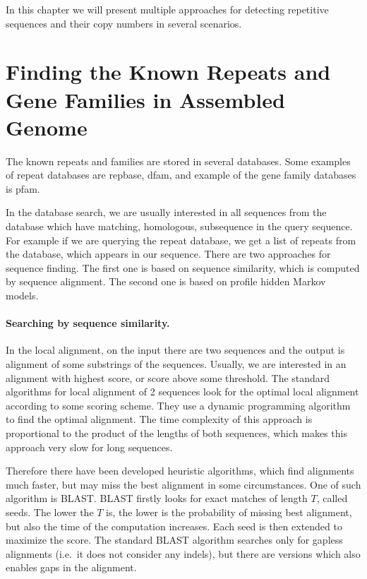 In this chapter we will present multiple approaches for detecting repetitive sequences and their copy numbers in several scenarios.


\section{Finding the Known Repeats and Gene Families in Assembled Genome}

The known repeats and families are stored in several databases. Some examples of repeat databases are repbase\cite{repbase}, dfam\cite{dfam}, and example of the gene family databases is pfam\cite{pfam}.

In the database search, we are usually interested in all  sequences from the database which have matching, homologous, subsequence in the query sequence. For example if we are querying the repeat database, we get a list of repeats from the database, which appears in our sequence.
There are two approaches for sequence finding. The first one is based on sequence similarity, which is computed by sequence alignment. The second one is based on profile hidden Markov models.

\paragraph{Searching by sequence similarity.}
In the local alignment, on the input there are two sequences and the output is alignment of some substrings of the sequences. Usually, we are interested in an alignment with highest score, or score above some threshold.
The standard algorithms for local alignment of 2 sequences look for the optimal local alignment according to some scoring scheme. They use a dynamic programming algorithm to find the optimal alignment. The time complexity of this approach is proportional to the product of the lengths of both sequences, which makes this approach very slow for long sequences.

Therefore there have been developed heuristic algorithms, which find alignments much faster, but may miss the best alignment in some circumstances. One of such algorithm is BLAST\cite{blast}.
BLAST firstly looks for exact matches of length $T$, called seeds. The lower the $T$ is, the lower is the probability of missing best alignment, but also the time of the computation increases.
Each seed is then extended to maximize the score. The standard BLAST algorithm searches only for gapless alignments (i.e.\ it does not consider any indels), but there are versions which also enables gaps in the alignment.

